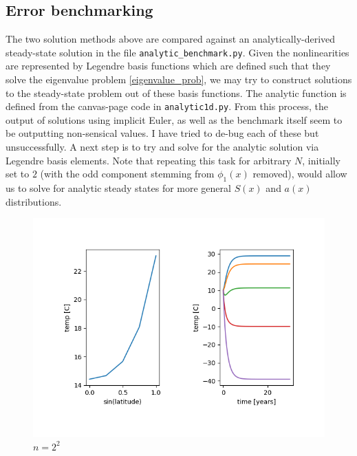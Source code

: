 \documentclass{article}
\theoremstyle{remark}
\begin{document}
\subsection{Error benchmarking}

The two solution methods above are compared against an analytically-derived steady-state
solution in the file \verb+analytic_benchmark.py+. Given the nonlinearities are represented
by Legendre basis functions which are defined such that they solve the eigenvalue problem
\eqref{eigenvalue_prob}, we may try to construct solutions to the steady-state problem
out of these basis functions. The analytic function is defined from the canvas-page code
in \verb+analytic1d.py+. From this process, the output of solutions using implicit Euler,
as well as the benchmark itself seem to be outputting non-sensical values. I have tried to
de-bug each of these but unsuccessfully. A next step is to try and 
solve for the analytic solution via Legendre basis elements. Note that repeating this task 
for arbitrary $N$, initially set to $2$ (with the odd component stemming from $\phi_1(x)$ removed),
would allow us to solve for analytic steady states for more general $S(x)$ and $a(x)$ distributions. 


\begin{figure}
\centering
\includegraphics{n2e2.png}
\caption{$n = 2^2$}
\end{figure}
\end{document}
